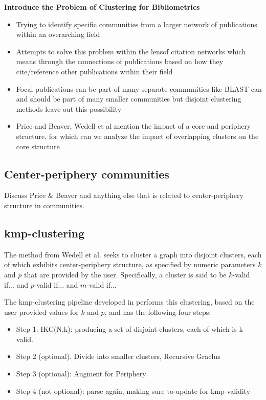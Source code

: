 \documentclass{article}
\begin{document}
\textbf{ Introduce the Problem of Clustering for Bibliometrics}
\begin{itemize}
	\item Trying to identify specific communities from a larger network of publications within an overarching field
	\item Attempts to solve this problem within the lensof citation networks which means through the connections of publications based on how they cite/reference other publications within their field
	\item Focal publications can be part of many separate communities like BLAST can and should be part of many smaller communities but disjoint clustering methods leave out this possibility 
	\item Price and Beaver, Wedell et al mention the impact of a core and periphery structure, for which can we analyze the impact of overlapping clusters on the core structure
 \end{itemize}
 
 
\subsection{Center-periphery communities}

Discuss Price \& Beaver \cite{price_1966} and anything else that is related to center-periphery structure in communities.

\subsection{kmp-clustering }

The method from Wedell et al. \cite{Wedell2022} seeks to  cluster a graph into disjoint clusters, each of which 
exhibits center-periphery structure, as specified by numeric parameters $k$ and $p$ that are provided by the user.
Specifically, a cluster is said to be $k$-valid if... and $p$-valid if... and $m$-valid if...


The kmp-clustering pipeline developed in \cite{Wedell2022}  performs this clustering, based on the user provided values for $k$ and $p$, and has the following four steps: 
\begin{itemize}
	\item Step 1: IKC(N,k): producing a set of disjoint clusters, each of which is k-valid.
	\item Step 2 (optional). Divide into smaller clusters, Recursive Graclus
	\item Step 3 (optional): Augment for Periphery
	\item Step 4 (not optional): parse again, making sure to update for kmp-validity
\end{itemize}
\end{document}

